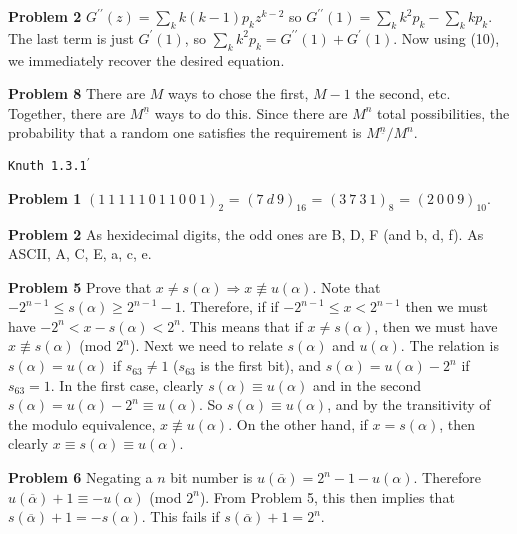 \vskip 0.1in
\noindent
{\bf Problem 2} $G^{\prime\prime} \left(z\right)= \sum_k k \left(k - 1\right) p_k z^{k-2}$ so
 $G^{\prime\prime} \left(1\right) = \sum_k k^2 p_k - \sum_k k p_k.$  The last term is just 
 $G^{\prime} \left(1\right)$, so $\sum_k k^2 p_k = G^{\prime\prime} \left(1\right) + G^{\prime}
  \left(1\right).$  Now using (10), we immediately recover the desired equation.
  
\vskip 0.1in
\noindent
{\bf Problem 8} There are $M$ ways to chose the first, $M-1$ the second, etc.  Together, there are
 $M^{\underline n}$ ways to do this.  Since there are $M^n$ total possibilities, the probability
 that a random one satisfies the requirement is $M^{\underline n} / M^n$.
 
\vskip 0.5in
\centerline{\tt Knuth 1.3.1$^{\prime}$}
\vskip 0.3in

\noindent
{\bf Problem 1} $\left(1\ 1\ 1\ 1\ 1\ 0\ 1\ 1\ 0\ 0\ 1\right)_2$ = $\left(7\ d\ 9 \right)_{16}$ = 
 $\left(3\ 7\ 3\ 1\right)_8$ = $\left(2\ 0\ 0\ 9\right)_{10}$.
 
 \vskip 0.1in
 \noindent
 {\bf Problem 2} As hexidecimal digits, the odd ones are B, D, F (and b, d, f).
  As ASCII, A, C, E, a, c, e.

\vskip 0.1in
\noindent
{\bf Problem 5} Prove that $x \neq s\left(\alpha\right)  \Rightarrow x \not\equiv u\left(\alpha\right)$.
Note that $-2^{n-1} \le s\left(\alpha\right) \ge 2^{n-1}-1$.  Therefore, if
if $-2^{n-1} \le x < 2^{n-1}$ then we must have $-2^n < x - s\left(\alpha\right) < 2^n$.
This means that if $x \neq s\left(\alpha\right)$, then we must have
$x \not\equiv s\left(\alpha\right)$ (mod $2^n$).  Next we need to relate 
$s\left(\alpha\right)$ and $u\left( \alpha \right)$.  The relation is
$s\left(\alpha\right) = u\left(\alpha\right)$ if $s_{63} \neq 1$ ($s_{63}$ is the first
bit), and $s\left(\alpha\right) = u\left(\alpha\right)-2^n$ if $s_{63} = 1$.
In the first case, clearly $s\left(\alpha\right) \equiv u\left(\alpha\right)$ and
in the second $s \left( \alpha \right) = u\left(\alpha\right) - 2^n \equiv u \left(\alpha\right)$.
So $s\left( \alpha \right) \equiv u\left(\alpha\right)$, and by the transitivity of
the modulo equivalence, $x \not\equiv u\left(\alpha\right)$.  On the other hand,
if $x = s \left(\alpha\right)$, then clearly $x \equiv s \left( \alpha \right) \equiv u \left( \alpha \right)$.

\vskip 0.1in
\noindent
{\bf Problem 6} Negating a $n$ bit number is $u\left( \overline \alpha \right) = 2^n - 1 - 
u \left( \alpha \right)$.  Therefore $u \left( \overline \alpha \right) + 1 \equiv - u \left( \alpha \right)$
(mod $2^n$).  From Problem 5, this then implies that $s \left( \overline \alpha \right) + 1 =
- s \left( \alpha \right)$.  This fails if $s \left( \overline \alpha \right) + 1 = 2^n$.

